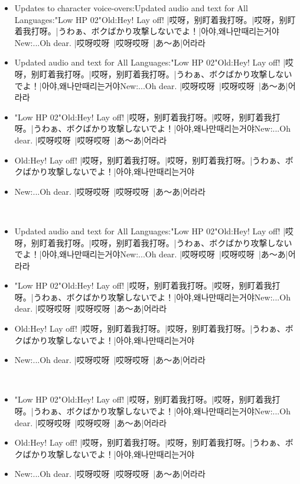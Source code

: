\documentclass[a4paper,12pt]{article}
\begin{document}
\begin{itemize}
\item Updates to character voice-overs:Updated audio and text for All Languages:"Low HP 02"Old:Hey! Lay off! |哎呀，别盯着我打呀。|哎呀，别盯着我打呀。|うわぁ、ボクばかり攻撃しないでよ！|아야,왜나만때리는거야New:...Oh dear. |哎呀哎呀~|哎呀哎呀~|あ～あ|어라라~
\item Updated audio and text for All Languages:"Low HP 02"Old:Hey! Lay off! |哎呀，别盯着我打呀。|哎呀，别盯着我打呀。|うわぁ、ボクばかり攻撃しないでよ！|아야,왜나만때리는거야New:...Oh dear. |哎呀哎呀~|哎呀哎呀~|あ～あ|어라라~
\item "Low HP 02"Old:Hey! Lay off! |哎呀，别盯着我打呀。|哎呀，别盯着我打呀。|うわぁ、ボクばかり攻撃しないでよ！|아야,왜나만때리는거야New:...Oh dear. |哎呀哎呀~|哎呀哎呀~|あ～あ|어라라~
\item Old:Hey! Lay off! |哎呀，别盯着我打呀。|哎呀，别盯着我打呀。|うわぁ、ボクばかり攻撃しないでよ！|아야,왜나만때리는거야
\item New:...Oh dear. |哎呀哎呀~|哎呀哎呀~|あ～あ|어라라~
\end{itemize}\\ \par \vspace{0.5cm}

\begin{itemize}
\item Updated audio and text for All Languages:"Low HP 02"Old:Hey! Lay off! |哎呀，别盯着我打呀。|哎呀，别盯着我打呀。|うわぁ、ボクばかり攻撃しないでよ！|아야,왜나만때리는거야New:...Oh dear. |哎呀哎呀~|哎呀哎呀~|あ～あ|어라라~
\item "Low HP 02"Old:Hey! Lay off! |哎呀，别盯着我打呀。|哎呀，别盯着我打呀。|うわぁ、ボクばかり攻撃しないでよ！|아야,왜나만때리는거야New:...Oh dear. |哎呀哎呀~|哎呀哎呀~|あ～あ|어라라~
\item Old:Hey! Lay off! |哎呀，别盯着我打呀。|哎呀，别盯着我打呀。|うわぁ、ボクばかり攻撃しないでよ！|아야,왜나만때리는거야
\item New:...Oh dear. |哎呀哎呀~|哎呀哎呀~|あ～あ|어라라~
\end{itemize}\\ \par \vspace{0.5cm}

\begin{itemize}
\item "Low HP 02"Old:Hey! Lay off! |哎呀，别盯着我打呀。|哎呀，别盯着我打呀。|うわぁ、ボクばかり攻撃しないでよ！|아야,왜나만때리는거야New:...Oh dear. |哎呀哎呀~|哎呀哎呀~|あ～あ|어라라~
\item Old:Hey! Lay off! |哎呀，别盯着我打呀。|哎呀，别盯着我打呀。|うわぁ、ボクばかり攻撃しないでよ！|아야,왜나만때리는거야
\item New:...Oh dear. |哎呀哎呀~|哎呀哎呀~|あ～あ|어라라~
\end{itemize}\\ \par \vspace{0.5cm}
\end{document}
